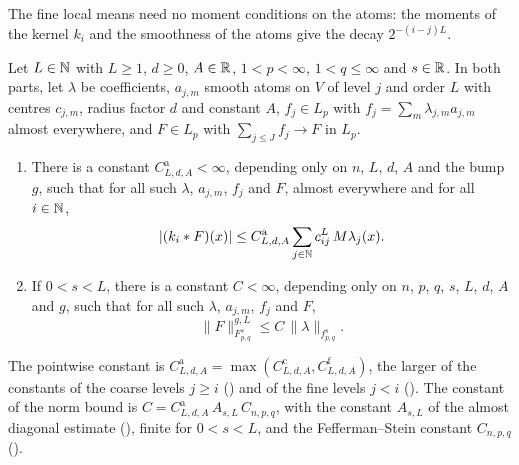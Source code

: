 The fine local means need no moment conditions on the atoms: the moments of the kernel $k_i$ and
the smoothness of the atoms give the decay $2^{-(i-j)L}$.

\begin{theorem}
\label{thm:tl-atomic-synthesis}
\leanok
{}
Let $L \in \mathbb{N}$ with $L \geq 1$, $d \geq 0$, $A \in \mathbb{R}$, $1 < p < \infty$, $1 < q \leq \infty$
and $s \in \mathbb{R}$. In both parts, let $\lambda$ be coefficients, $a_{j,m}$ smooth atoms on $V$ of
level $j$ and order $L$ with centres $c_{j,m}$, radius factor $d$ and constant $A$, $f_j \in L_p$
with $f_j = \sum_m \lambda_{j,m} a_{j,m}$ almost everywhere, and $F \in L_p$ with
$\sum_{j \leq J} f_j \to F$ in $L_p$.
\begin{enumerate}
  \item There is a constant $C^{\mathrm a}_{L,d,A} < \infty$, depending only on $n$, $L$, $d$,
    $A$ and the bump $g$, such that for all such $\lambda$, $a_{j,m}$, $f_j$ and $F$, almost
    everywhere and for all $i \in \mathbb{N}$,
    \[
      |(k_i * F)(x)| \leq C^{\mathrm a}_{L,d,A} \sum_{j \in \mathbb{N}} c^L_{ij} \, M \lambda_j(x) .
    \]
  \item If $0 < s < L$, there is a constant $C < \infty$, depending only on $n$, $p$, $q$, $s$,
    $L$, $d$, $A$ and $g$, such that for all such $\lambda$, $a_{j,m}$, $f_j$ and $F$,
    \[
      \|F\|^{g,L}_{F^s_{p,q}} \leq C \, \|\lambda\|_{f^s_{p,q}} .
    \]
\end{enumerate}
\end{theorem}

The pointwise constant is
$C^{\mathrm a}_{L,d,A} = \max(C^{\mathrm c}_{L,d,A}, C^{\mathrm f}_{L,d,A})$, the larger of the
constants of the coarse levels $j \geq i$ () and of the fine
levels $j < i$ (). The constant of the norm bound is
$C = C^{\mathrm a}_{L,d,A} \, A_{s,L} \, C_{n,p,q}$, with the constant $A_{s,L}$ of the almost
diagonal estimate (), finite for $0 < s < L$, and the Fefferman--Stein
constant $C_{n,p,q}$ ().

